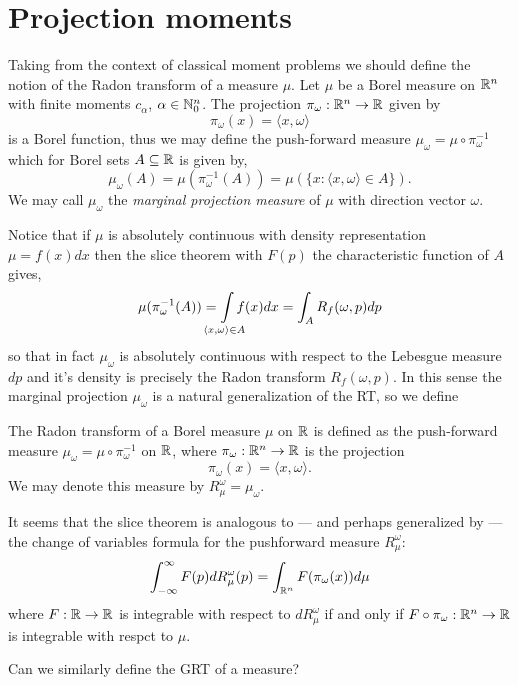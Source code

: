 
\section{Projection moments}

Taking from the context of classical moment problems we should define the notion of the Radon transform of a measure $\mu$. Let $\mu$ be a Borel measure on $\mathbb{R}^n$ with finite moments $c_\alpha$, $\alpha \in \mathbb{N}_0^n$. The projection $\pi_\omega : \mathbb{R}^n \rightarrow \mathbb{R}$ given by
\[
  \pi_\omega(x) = \langle x, \omega \rangle
\] 
is a Borel function, thus we may define the push-forward measure $\mu_\omega = \mu \circ \pi_\omega^{-1}$ which for Borel sets $A \subseteq \mathbb{R}$ is given by,
\[
  \mu_\omega(A) = \mu(\pi_\omega^{-1}(A)) = \mu(\{x : \langle x, \omega \rangle \in A\}).
\]
We may call $\mu_\omega$ the \emph{marginal projection measure} of $\mu$ with direction vector $\omega$.

Notice that if $\mu$ is absolutely continuous with density representation $\mu = f(x)dx$ then the slice theorem with $F(p)$ the characteristic function of $A$ gives,
\[
  \mu(\pi_\omega^{-1}(A)) = \int\mclimits_{\langle x, \omega \rangle \in A} f(x)dx = \int_A R_f(\omega, p) dp
\]
so that in fact $\mu_\omega$ is absolutely continuous with respect to the Lebesgue measure $dp$ and it's density is precisely the Radon transform $R_f(\omega, p)$. In this sense the marginal projection $\mu_\omega$ is a natural generalization of the RT, so we define

\begin{definition}
  The Radon transform of a Borel measure $\mu$ on $\mathbb{R}$ is defined as the push-forward measure $\mu_\omega = \mu \circ \pi_\omega^{-1}$ on $\mathbb{R}$, where $\pi_\omega: \mathbb{R}^n \rightarrow \mathbb{R}$ is the projection 
  \[
    \pi_\omega(x) = \langle x, \omega \rangle.
  \]
  We may denote this measure by $R_\mu^\omega = \mu_\omega$.
\end{definition}

\begin{remark}
  It seems that the slice theorem is analogous to — and perhaps generalized by — the change of variables formula for the pushforward measure $R^\omega_\mu$:
  \[
    \int_{-\infty}^\infty F(p) dR^\omega_\mu(p) = \int_{\mathbb{R}^n} F(\pi_\omega(x)) d\mu
  \]
  where $F:\mathbb{R} \rightarrow \mathbb{R}$ is integrable with respect to $dR^\omega_\mu$ if and only if $F\circ\pi_\omega : \mathbb{R}^n \rightarrow \mathbb{R}$ is integrable with respct to $\mu$.
\end{remark}
Can we similarly define the GRT of a measure?

